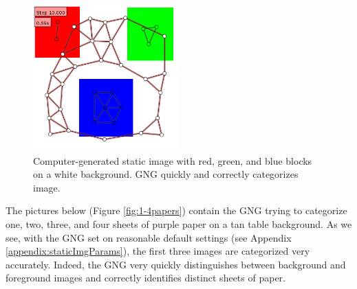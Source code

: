 \documentclass{article}
\renewcommand{\|}{\origbar} %
\begin{document}
\begin{figure}[h!]
  \begin{center}
    \includegraphics[width=0.5\textwidth]{rgb_static.png}
  \end{center}
  \caption{Computer-generated static image with red, green, and blue blocks on a white background. GNG quickly and correctly categorizes image.}
  \label{fig:rgbStatic}
\end{figure}

The pictures below (Figure \ref{fig:1-4papers}) contain the GNG trying to categorize one, two, three, and four sheets of purple paper on a tan table background. As we see, with the GNG set on reasonable default settings (see Appendix \ref{appendix:staticImgParams}), the first three images are categorized very accurately. Indeed, the GNG very quickly distinguishes between background and foreground images and correctly identifies distinct sheets of paper. 
\end{document}
